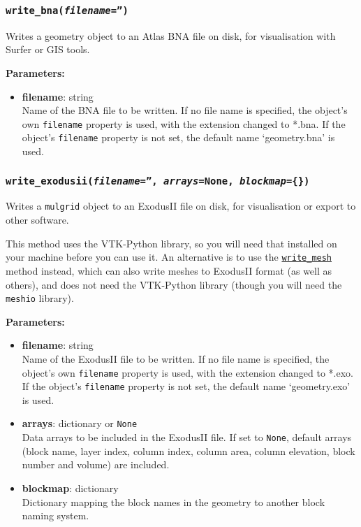 \begin{snugshade}\subsubsection{\texttt{write\_bna(\emph{filename}='')}}\end{snugshade}
\label{sec:mulgrid:write_bna}

Writes a geometry object to an Atlas BNA file on disk, for visualisation with Surfer or GIS tools.

\textbf{Parameters:}
\begin{itemize}
\item \textbf{filename}: string\\
  Name of the BNA file to be written.  If no file name is specified, the object's own \texttt{filename} property is used, with the extension changed to *.bna.  If the object's \texttt{filename} property is not set, the default name `geometry.bna' is used.
\end{itemize}

\begin{snugshade}\subsubsection{\texttt{write\_exodusii(\emph{filename}='', \emph{arrays}=None, \emph{blockmap}=\{\})}}\end{snugshade}
\label{sec:mulgrid:write_exodusii}

Writes a \texttt{mulgrid} object to an ExodusII file on disk, for visualisation or export to other software.

This method uses the VTK-Python library, so you will need that installed on your machine before you can use it. An alternative is to use the \hyperref[sec:mulgrid:write_mesh]{\texttt{write\_mesh}} method instead, which can also write meshes to ExodusII format (as well as others), and does not need the VTK-Python library (though you will need the \texttt{meshio} library).

\textbf{Parameters:}
\begin{itemize}
\item \textbf{filename}: string\\
  Name of the ExodusII file to be written.  If no file name is specified, the object's own \texttt{filename} property is used, with the extension changed to *.exo.  If the object's \texttt{filename} property is not set, the default name `geometry.exo' is used.
\item \textbf{arrays}: dictionary or \texttt{None}\\
  Data arrays to be included in the ExodusII file.  If set to \texttt{None}, default arrays (block name, layer index, column index, column area, column elevation, block number and volume) are included.
\item \textbf{blockmap}: dictionary\\
  Dictionary mapping the block names in the geometry to another block naming system.
\end{itemize}

